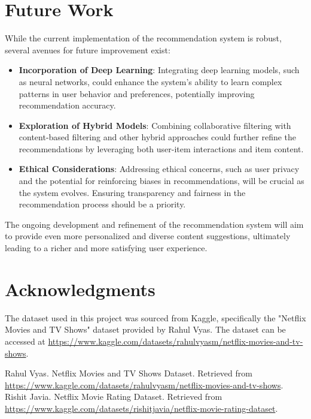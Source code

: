 \documentclass[sigconf]{acmart}
\begin{document}
	\section{Future Work}
	While the current implementation of the recommendation system is robust, several avenues for future improvement exist:
	\begin{itemize}
		\item \textbf{Incorporation of Deep Learning}: Integrating deep learning models, such as neural networks, could enhance the system's ability to learn complex patterns in user behavior and preferences, potentially improving recommendation accuracy.
		\item \textbf{Exploration of Hybrid Models}: Combining collaborative filtering with content-based filtering and other hybrid approaches could further refine the recommendations by leveraging both user-item interactions and item content.
		\item \textbf{Ethical Considerations}: Addressing ethical concerns, such as user privacy and the potential for reinforcing biases in recommendations, will be crucial as the system evolves. Ensuring transparency and fairness in the recommendation process should be a priority.
	\end{itemize}
	The ongoing development and refinement of the recommendation system will aim to provide even more personalized and diverse content suggestions, ultimately leading to a richer and more satisfying user experience.
	\section*{Acknowledgments}
	The dataset used in this project was sourced from Kaggle, specifically the "Netflix Movies and TV Shows" dataset provided by Rahul Vyas. The dataset can be accessed at \url{https://www.kaggle.com/datasets/rahulvyasm/netflix-movies-and-tv-shows}.
	
	\begin{thebibliography}{00}
		 Rahul Vyas. Netflix Movies and TV Shows Dataset. Retrieved from \url{https://www.kaggle.com/datasets/rahulvyasm/netflix-movies-and-tv-shows}.
		 Rishit Javia. Netflix Movie Rating Dataset. Retrieved from \url{https://www.kaggle.com/datasets/rishitjavia/netflix-movie-rating-dataset}.
	\end{thebibliography}
	
\end{document}
